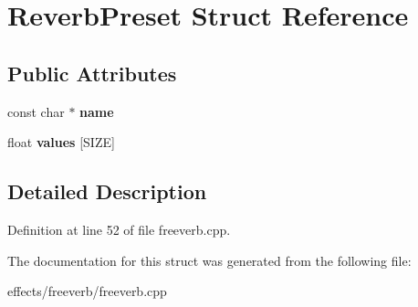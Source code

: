 \hypertarget{struct_reverb_preset}{}\section{Reverb\+Preset Struct Reference}
\label{struct_reverb_preset}
\subsection*{Public Attributes}
\begin{DoxyCompactItemize}
\item 
\mbox{\label{struct_reverb_preset_a01ed5a9c9d3cde5bed723a40cde1b85e}} 
const char $\ast$ {\bfseries name}
\item 
\mbox{\label{struct_reverb_preset_ab33e3b06a5837f4da907b3646f35cea6}} 
float {\bfseries values} \mbox{[}S\+I\+ZE\mbox{]}
\end{DoxyCompactItemize}


\subsection{Detailed Description}


Definition at line 52 of file freeverb.\+cpp.



The documentation for this struct was generated from the following file\+:\begin{DoxyCompactItemize}
\item 
effects/freeverb/freeverb.\+cpp\end{DoxyCompactItemize}
